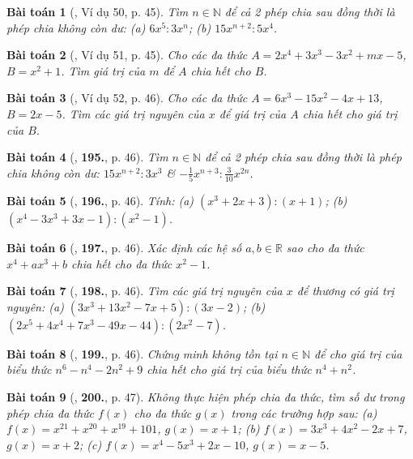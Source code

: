 \documentclass{article}
\numberwithin{equation}{section}
\newtheorem{baitoan}{Bài toán}
\begin{document}
\begin{baitoan}[\cite{Tuyen_Toan_7}, Ví dụ 50, p. 45]
	Tìm $n\in\mathbb{N}$ để cả 2 phép chia sau đồng thời là phép chia không còn dư: (a) $6x^5:3x^n$; (b) $15x^{n+2}:5x^4$.
\end{baitoan}

\begin{baitoan}[\cite{Tuyen_Toan_7}, Ví dụ 51, p. 45]
	Cho các đa thức $A = 2x^4 + 3x^3 - 3x^2 + mx - 5$, $B = x^2 + 1$. Tìm giá trị của $m$ để $A$ chia hết cho $B$.
\end{baitoan}

\begin{baitoan}[\cite{Tuyen_Toan_7}, Ví dụ 52, p. 46]
	Cho các đa thức $A = 6x^3 - 15x^2 - 4x + 13$, $B = 2x - 5$. Tìm các giá trị nguyên của $x$ để giá trị của $A$ chia hết cho giá trị của $B$.
\end{baitoan}

\begin{baitoan}[\cite{Tuyen_Toan_7}, \textbf{195.}, p. 46]
	Tìm $n\in\mathbb{N}$ để cả 2 phép chia sau đồng thời là phép chia không còn dư: $15x^{n+2}:3x^3$ \& $-\frac{1}{5}x^{n+3}:\frac{3}{10}x^{2n}$.
\end{baitoan}

\begin{baitoan}[\cite{Tuyen_Toan_7}, \textbf{196.}, p. 46]
	Tính: (a) $(x^3 + 2x + 3):(x + 1)$; (b) $(x^4 - 3x^3 + 3x - 1):(x^2 - 1)$.
\end{baitoan}

\begin{baitoan}[\cite{Tuyen_Toan_7}, \textbf{197.}, p. 46]
	Xác định các hệ số $a,b\in\mathbb{R}$ sao cho đa thức $x^4 + ax^3 + b$ chia hết cho đa thức $x^2 - 1$.
\end{baitoan}

\begin{baitoan}[\cite{Tuyen_Toan_7}, \textbf{198.}, p. 46]
	Tìm các giá trị nguyên của $x$ để thương có giá trị nguyên: (a) $(3x^3 + 13x^2 - 7x + 5):(3x - 2)$; (b) $(2x^5 + 4x^4 + 7x^3 - 49x - 44):(2x^2 - 7)$.
\end{baitoan}

\begin{baitoan}[\cite{Tuyen_Toan_7}, \textbf{199.}, p. 46]
	Chứng minh không tồn tại $n\in\mathbb{N}$ để cho giá trị của biểu thức $n^6 - n^4 - 2n^2 + 9$ chia hết cho giá trị của biểu thức $n^4 + n^2$.
\end{baitoan}

\begin{baitoan}[\cite{Tuyen_Toan_7}, \textbf{200.}, p. 47]
	Không thực hiện phép chia đa thức, tìm số dư trong phép chia đa thức $f(x)$ cho đa thức $g(x)$ trong các trường hợp sau: (a) $f(x) = x^{21} + x^{20} + x^{19} + 101$, $g(x) = x + 1$; (b) $f(x) = 3x^3 + 4x^2 - 2x + 7$, $g(x) = x + 2$; (c) $f(x) = x^4 - 5x^3 + 2x - 10$, $g(x) = x - 5$.
\end{baitoan}
\end{document}
